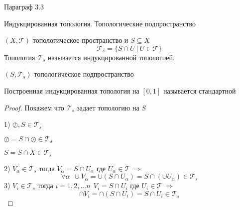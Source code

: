 \begin{title}[\Large]
  Параграф 3.3
\end{title}

\begin{title}[\Large]
  Индукцированная топология. Топологические подпространство
\end{title}

\begin{define}
  $(X, \mathcal{T})$ топологическое пространство и $S \subseteq X$
  $$
  \mathcal{T}_s = \{ S \cap U ~ | ~ U \in \mathcal{T} \}
  $$
  Топология $\mathcal{T}_s$ называется индукцированной топологией.

  $(S, \mathcal{T}_s)$ топологическое подпространство

  Построенная индукцированная топология на $[0,1]$ называется стандартной
\end{define}

\begin{proof}
  Покажем что $\mathcal{T}_s$ задает топологию на $S$

  1) $\oslash, S \in \mathcal{T}_s$

  $\oslash = S \cap \oslash \in \mathcal{T}_s$

  $S = S \cap X \in \mathcal{T}_s$

  2) $V_{\alpha} \in \mathcal{T}_s$ тогда
  $V_{\alpha} = S \cap U_{\alpha}$ где $U_{\alpha} \in \mathcal{T} ~
  \Rightarrow$
  $$
  \forall \alpha ~~ \cup V_{\alpha} =
  \cup(S \cap U_{\alpha}) = S \cap (\cup U_{\alpha}) \in \mathcal{T}_s
  $$
  3) $V_i \in \mathcal{T}_s$ тогда
  $i = 1,2, \ldots n ~~ V_i = S \cap U_i$ где $U_i \in \mathcal{T} ~
  \Rightarrow$
  $$
  \cap V_i = \cap(S \cap U_i) = S \cap U_i \in \mathcal{T}_s
  $$
\end{proof}